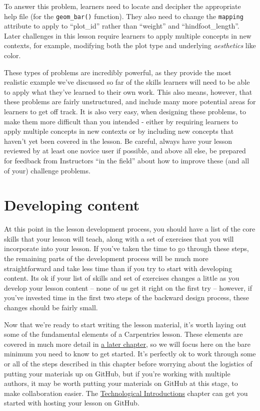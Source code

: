 \documentclass[
]{book}
\begin{document}
To answer this problem, learners need to locate and decipher the appropriate help file (for
the \texttt{geom\_bar()} function). They also need to change the \texttt{mapping} attribute to apply to ``plot\_id'' rather than ``weight'' and ``hindfoot\_length''. Later challenges in this lesson require
learners to apply multiple concepts in new contexts, for example, modifying both the plot type
and underlying \emph{aesthetics} like color.

These types of problems are incredibly powerful, as
they provide the most realistic example we've discussed so far of the skills learners will
need to be able to apply what they've learned to their own work. This also means, however,
that these problems are fairly unstructured, and include many more potential areas for learners
to get off track. It is also very easy, when designing these problems, to make them more
difficult than you intended - either by requiring learners to apply multiple concepts in new
contexts or by including new concepts that haven't yet been covered in the lesson. Be careful,
always have your lesson reviewed by at least one novice user if possible, and above all else,
be prepared for feedback from Instructors ``in the field'' about how to improve these (and all of your) challenge problems.

\hypertarget{developing-content}{%
\chapter{Developing content}\label{developing-content}}

At this point in the lesson development process, you should have a list of the core skills that your lesson
will teach, along with a set of exercises that you will incorporate into your lesson. If you've taken the time
to go through these steps, the remaining parts of the development process will be much more straightforward
and take less time than if you try to start with developing content. Its ok if your list of skills and set
of exercises changes a little as you develop your lesson content -- none of us get it right on the first try --
however, if you've invested time in the first two steps of the backward design process,
these changes should be fairly small.

Now that we're ready to start writing the lesson material, it's worth laying out some of the fundamental
elements of a Carpentries lesson. These elements are covered in much more detail in \href{https://carpentries.github.io/curriculum-development/technological-introductions.html}{a later chapter}, so we will focus
here on the bare minimum you need to know to get started. It's perfectly ok to work through some or all of the
steps described in this chapter before worrying about the logistics of putting your materials up on GitHub,
but if you're working with multiple authors, it may be worth putting your materials on GitHub at this stage,
to make collaboration easier. The \href{https://carpentries.github.io/curriculum-development/technological-introductions.html}{Technological Introductions} chapter
can get you started with hosting your lesson on GitHub.
\end{document}
